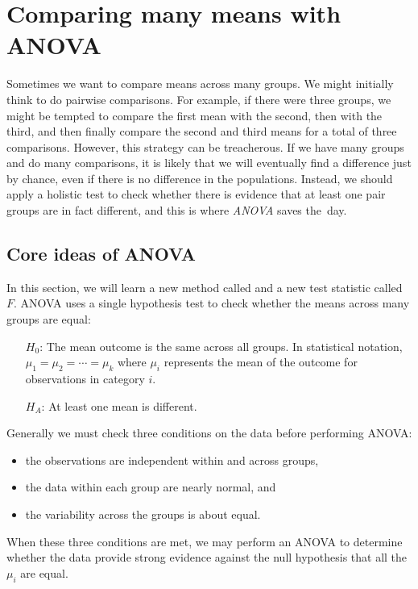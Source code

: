 \section{Comparing many means with ANOVA}
\label{anovaAndRegrWithCategoricalVariables}


\noindent%
Sometimes we want to compare means across many groups.
We might initially think to do pairwise comparisons.
For example, if there were three groups, we might be tempted
to compare the first mean with the second,
then with the third,
and then finally compare the second and third means for
a total of three comparisons.
However, this strategy can be treacherous.
If we have many groups and do many comparisons,
it is likely that we will eventually find a difference
just by chance, even if there is no difference in the
populations.
Instead, we should apply a holistic test to check whether
there is evidence that at least one pair groups are
in fact different, and this is where \emph{ANOVA} saves
the~day.


\subsection{Core ideas of ANOVA}

In this section, we will learn a new method called
 and a new test
statistic called $F$.
ANOVA uses a single hypothesis test to check whether
the means across many groups are equal:
\begin{itemize}
\setlength{\itemsep}{0mm}
\item[$H_0$:] The mean outcome is the same across all groups. In statistical notation, $\mu_1 = \mu_2 = \cdots = \mu_k$ where $\mu_i$ represents the mean of the outcome for observations in category $i$.
\item[$H_A$:] At least one mean is different.
\end{itemize}
Generally we must check three conditions on the data before performing ANOVA:
\begin{itemize}
\setlength{\itemsep}{0mm}
\item the observations are independent within and across groups,
\item the data within each group are nearly normal, and
\item the variability across the groups is about equal.
\end{itemize}
When these three conditions are met, we may perform an ANOVA to determine whether the data provide strong evidence against the null hypothesis that all the $\mu_i$ are equal.

